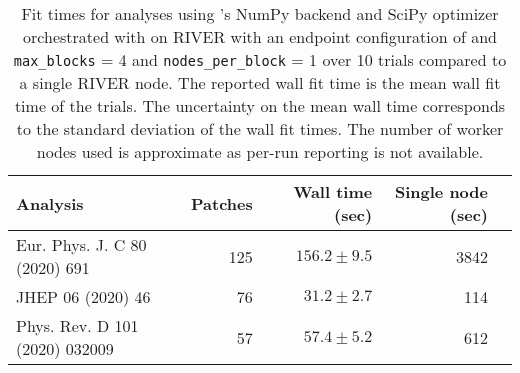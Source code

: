 \begin{table}[htpb]
\centering
\caption{Fit times for analyses using \pyhf{}'s NumPy backend and SciPy optimizer orchestrated with \funcX{} on RIVER with an endpoint configuration of and \texttt{max\_blocks} = 4 and \texttt{nodes\_per\_block} = 1 over 10 trials compared to a single RIVER node. The reported wall fit time is the mean wall fit time of the trials. The uncertainty on the mean wall time corresponds to the standard deviation of the wall fit times. The number of worker nodes used is approximate as per-run reporting is not available.}
\label{table:performance}
\begin{tabular}{@{}lrrrr@{}}
\toprule
                      Analysis & Patches & Wall time (sec) & Single node (sec) \\
\midrule
 Eur. Phys. J. C 80 (2020) 691 &     125 &   $156.2\pm9.5$ &              3842 \\
             JHEP 06 (2020) 46 &      76 &    $31.2\pm2.7$ &               114 \\
Phys. Rev. D 101 (2020) 032009 &      57 &    $57.4\pm5.2$ &               612 \\
\bottomrule
\end{tabular}
\end{table}
